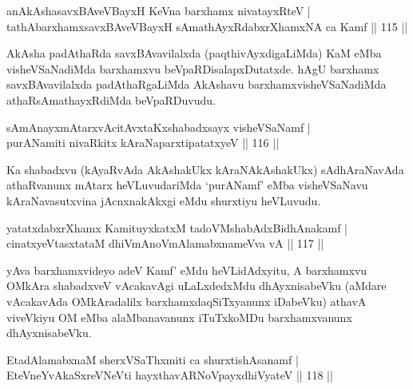 
\begin{shl}
anAkAshasavxBAveVBayxH KeVna barxhamx nivatayxRteV  | \\
tathA\s barxhamxsavxBAveVBayxH sAmathAyxRdabxrXhamxNA ca Kamf \hfill||  115 ||  
\end{shl}

\begin{artha}
AkAsha padAthaRda savxBAvavilalxda (paqthivAyxdigaLiMda) KaM eMba visheVSaNadiMda barxhamxvu beVpaRDisalapxDutatxde. hAgU barxhamx savxBAvavilalxda padAthaRgaLiMda AkAshavu barxhamxvisheVSaNadiMda athaRsAmathayxRdiMda beVpaRDuvudu.
\end{artha}

\begin{shl}
sAmAnayxmAtarxvAcitAvxtaKxshabadxsayx visheVSaNamf  | \\
purANamiti nivaRkitx kAraNaparxtipatatxyeV \hfill||  116 ||  
\end{shl}

\begin{artha}
Ka shabadxvu (kAyaRvAda AkAshakUkx kAraNAkAshakUkx) sAdhAraNavAda athaRvanunx mAtarx heVLuvudariMda `purANamf' eMba visheVSaNavu kAraNavasutxvina jAcnxnakAkxgi eMdu shurxtiyu heVLuvudu.
\end{artha}


\begin{shl}
yatatxdabxrXhamx KamituyxkatxM tadoVMshabAdxBidhAnakamf  | \\
cinatxyeVtasxtataM dhiVmAnoVmAlamabxnameVva vA \hfill||  117 ||  
\end{shl}

\begin{artha}
yAva barxhamxvideyo adeV Kamf' eMdu heVLidAdxyitu, A barxhamxvu OMkAra shabadxveV vAcakavAgi uLaLxdedxMdu dhAyxnisabeVku (aMdare vAcakavAda OMkAradalilx barxhamxdaqSiTxyanunx iDabeVku) athavA viveVkiyu OM eMba alaMbanavanunx iTuTxkoMDu barxhamxvanunx dhAyxnisabeVku.
\end{artha}


\begin{shl}
EtadAlamabxnaM sherxVSaThxmiti ca shurxtishAsanamf  | \\
EteVneYvAkaSxreVNeVti hayxthavARNoV\s payxdhiVyateV \hfill||  118 ||  
\end{shl}

